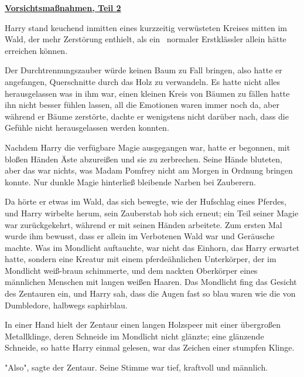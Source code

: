 

\hypertarget{vorsichtsmauxdfnahmen-teil-2}{%

\textbf{\uline{Vorsichtsmaßnahmen, Teil 2}}

Harry stand keuchend inmitten eines kurzzeitig verwüsteten Kreises mitten im Wald, der mehr Zerstörung enthielt, als ein ~normaler Erstklässler allein hätte erreichen können.

Der Durchtrennungszauber würde keinen Baum zu Fall bringen, also hatte er angefangen, Querschnitte durch das Holz zu verwandeln. Es hatte nicht alles herausgelassen was in ihm war, einen kleinen Kreis von Bäumen zu fällen hatte ihn nicht besser fühlen lassen, all die Emotionen waren immer noch da, aber während er Bäume zerstörte, dachte er wenigstens nicht darüber nach, dass die Gefühle nicht herausgelassen werden konnten.

Nachdem Harry die verfügbare Magie ausgegangen war, hatte er begonnen, mit bloßen Händen Äste abzureißen und sie zu zerbrechen. Seine Hände bluteten, aber das war nichts, was Madam Pomfrey nicht am Morgen in Ordnung bringen konnte. Nur dunkle Magie hinterließ bleibende Narben bei Zauberern.

Da hörte er etwas im Wald, das sich bewegte, wie der Hufschlag eines Pferdes, und Harry wirbelte herum, sein Zauberstab hob sich erneut; ein Teil seiner Magie war zurückgekehrt, während er mit seinen Händen arbeitete. Zum ersten Mal wurde ihm bewusst, dass er allein im Verbotenen Wald war und Geräusche machte. Was im Mondlicht auftauchte, war nicht das Einhorn, das Harry erwartet hatte, sondern eine Kreatur mit einem pferdeähnlichen Unterkörper, der im Mondlicht weiß-braun schimmerte, und dem nackten Oberkörper eines männlichen Menschen mit langen weißen Haaren. Das Mondlicht fing das Gesicht des Zentauren ein, und Harry sah, dass die Augen fast so blau waren wie die von Dumbledore, halbwegs saphirblau.

In einer Hand hielt der Zentaur einen langen Holzspeer mit einer übergroßen Metallklinge, deren Schneide im Mondlicht nicht glänzte; eine glänzende Schneide, so hatte Harry einmal gelesen, war das Zeichen einer stumpfen Klinge.

"Also", sagte der Zentaur. Seine Stimme war tief, kraftvoll und männlich.

}
